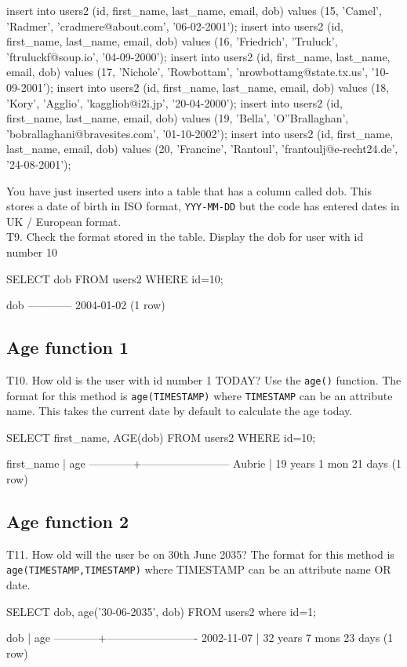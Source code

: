 \begin{sql}
insert into users2 (id, first_name, last_name, email, dob) values (15, 'Camel', 'Radmer', 'cradmere@about.com', '06-02-2001');
insert into users2 (id, first_name, last_name, email, dob) values (16, 'Friedrich', 'Truluck', 'ftruluckf@soup.io', '04-09-2000');
insert into users2 (id, first_name, last_name, email, dob) values (17, 'Nichole', 'Rowbottam', 'nrowbottamg@state.tx.us', '10-09-2001');
insert into users2 (id, first_name, last_name, email, dob) values (18, 'Kory', 'Agglio', 'kagglioh@i2i.jp', '20-04-2000');
insert into users2 (id, first_name, last_name, email, dob) values (19, 'Bella', 'O''Brallaghan', 'bobrallaghani@bravesites.com', '01-10-2002');
insert into users2 (id, first_name, last_name, email, dob) values (20, 'Francine', 'Rantoul', 'frantoulj@e-recht24.de', '24-08-2001');
\end{sql}
You have just inserted users into a table that has a column called dob. This stores a date of birth in ISO format, \verb|YYY-MM-DD| but the code has entered dates in UK / European format.\\

T9. Check the format stored in the table. Display the dob for user with id number 10
\begin{sql}
SELECT dob FROM users2 WHERE id=10;
\end{sql}
\begin{pseudo}
    dob
------------
 2004-01-02
(1 row)
\end{pseudo}

\subsection*{Age function 1}
T10. How old is the user with id number 1 TODAY? Use the \verb|age()| function. The format for this method is \verb|age(TIMESTAMP)| where \verb|TIMESTAMP| can be an attribute name. This takes the current date by default to calculate the age today.
\begin{sql}
SELECT first_name, AGE(dob) FROM users2 WHERE id=10;
\end{sql}
\begin{pseudo}
 first_name |          age
------------+------------------------
 Aubrie     | 19 years 1 mon 21 days
(1 row)
\end{pseudo}

\subsection*{Age function 2}
T11. How old will the user be on 30th June 2035? The format for this method is \verb|age(TIMESTAMP,TIMESTAMP)| where TIMESTAMP can be an attribute name OR  date.
\begin{sql}
SELECT dob, age('30-06-2035', dob) FROM users2 where id=1;
\end{sql}
\begin{pseudo}
    dob     |           age
------------+-------------------------
 2002-11-07 | 32 years 7 mons 23 days
(1 row)
\end{pseudo}

